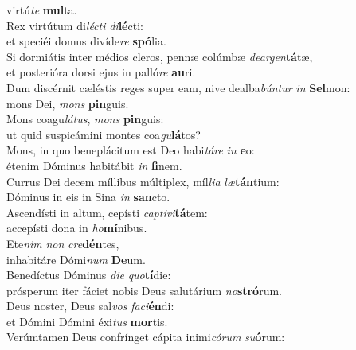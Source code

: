\evenverse virtú\textit{te} \textbf{mul}ta.\\
\oddverse Rex virtútum di\textit{lé}\textit{cti} \textit{di}\textbf{lé}cti:~\*\\
\oddverse et speciéi domus divíde\textit{re} \textbf{spó}lia.\\
\evenverse Si dormiátis inter médios cleros, pennæ colúmbæ \textit{de}\textit{ar}\textit{gen}\textbf{tá}tæ,~\*\\
\evenverse et posterióra dorsi ejus in palló\textit{re} \textbf{au}ri.\\
\oddverse Dum discérnit cæléstis reges super eam, nive dealba\textit{bún}\textit{tur} \textit{in} \textbf{Sel}mon:~\*\\
\oddverse mons Dei, \textit{mons} \textbf{pin}guis.\\
\evenverse Mons coagu\textit{lá}\textit{tus}, \textit{mons} \textbf{pin}guis:~\*\\
\evenverse ut quid suspicámini montes coa\textit{gu}\textbf{lá}tos?\\
\oddverse Mons, in quo beneplácitum est Deo habi\textit{tá}\textit{re} \textit{in} \textbf{e}o:~\*\\
\oddverse étenim Dóminus habitábit \textit{in} \textbf{fi}nem.\\
\evenverse Currus Dei decem míllibus múltiplex, míl\textit{li}\textit{a} \textit{læ}\textbf{tán}tium:~\*\\
\evenverse Dóminus in eis in Sina \textit{in} \textbf{san}cto.\\
\oddverse Ascendísti in altum, cepísti \textit{cap}\textit{ti}\textit{vi}\textbf{tá}tem:~\*\\
\oddverse accepísti dona in \textit{ho}\textbf{mí}nibus.\\
\evenverse Ete\textit{nim} \textit{non} \textit{cre}\textbf{dén}tes,~\*\\
\evenverse inhabitáre Dómi\textit{num} \textbf{De}um.\\
\oddverse Benedíctus Dóminus \textit{di}\textit{e} \textit{quo}\textbf{tí}die:~\*\\
\oddverse prósperum iter fáciet nobis Deus salutárium \textit{no}\textbf{stró}rum.\\
\evenverse Deus noster, Deus sal\textit{vos} \textit{fa}\textit{ci}\textbf{én}di:~\*\\
\evenverse et Dómini Dómini éxi\textit{tus} \textbf{mor}tis.\\
\oddverse Verúmtamen Deus confrínget cápita inimi\textit{có}\textit{rum} \textit{su}\textbf{ó}rum:~\*\\
